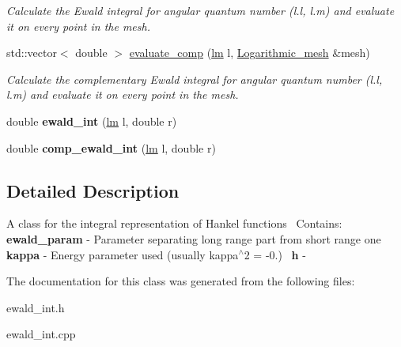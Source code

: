 \begin{DoxyCompactItemize}
\begin{DoxyCompactList}\small\item\em Calculate the Ewald integral for angular quantum number (l.\+l, l.\+m) and evaluate it on every point in the mesh. \end{DoxyCompactList}\item 
\mbox{\label{classEwald__integral_a6cba9e9c66347c0321cd55487304d25a}} 
std\+::vector$<$ double $>$ \hyperlink{classEwald__integral_a6cba9e9c66347c0321cd55487304d25a}{evaluate\+\_\+comp} (\hyperlink{structlm}{lm} l, \hyperlink{classLogarithmic__mesh}{Logarithmic\+\_\+mesh} \&mesh)
\begin{DoxyCompactList}\small\item\em Calculate the complementary Ewald integral for angular quantum number (l.\+l, l.\+m) and evaluate it on every point in the mesh. \end{DoxyCompactList}\item 
\mbox{\label{classEwald__integral_acb4f3774a2b38c549791d89aa2040143}} 
double {\bfseries ewald\+\_\+int} (\hyperlink{structlm}{lm} l, double r)
\item 
\mbox{\label{classEwald__integral_adb1795037f6bfbb41a01f15be2ad27b4}} 
double {\bfseries comp\+\_\+ewald\+\_\+int} (\hyperlink{structlm}{lm} l, double r)
\end{DoxyCompactItemize}


\subsection{Detailed Description}
A class for the integral representation of Hankel functions~\newline
Contains\+:~\newline
{\bfseries ewald\+\_\+param} -\/ Parameter separating long range part from short range one~\newline
{\bfseries kappa} -\/ Energy parameter used (usually kappa$^\wedge$2 = -\/0.)~\newline
{\bfseries h} -\/ 

The documentation for this class was generated from the following files\+:\begin{DoxyCompactItemize}
\item 
ewald\+\_\+int.\+h\item 
ewald\+\_\+int.\+cpp\end{DoxyCompactItemize}
